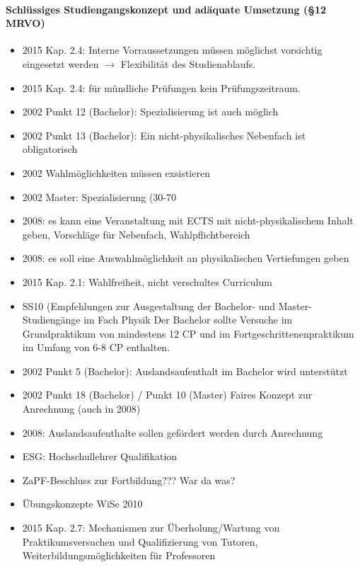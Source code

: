     \paragraph*{Schlüssiges Studiengangskonzept und adäquate Umsetzung (§12 MRVO)}
      \begin{itemize}
        \item 2015 Kap. 2.4: Interne Vorraussetzungen müssen möglichst vorsichtig eingesetzt werden $\rightarrow$ Flexibilität des Studienablaufs.
        \item 2015 Kap. 2.4: für mündliche Prüfungen kein Prüfungszeitraum.
        \item 2002 Punkt 12 (Bachelor): Spezialisierung ist auch möglich
        \item 2002 Punkt 13 (Bachelor): Ein nicht-physikalisches Nebenfach ist obligatorisch
        \item 2002 Wahlmöglichkeiten müssen exsistieren
        \item 2002 Master: Spezialisierung (30-70 %
        \item 2008: es kann eine Veranstaltung mit ECTS mit nicht-physikalischem Inhalt geben, Vorschläge für Nebenfach, Wahlpflichtbereich
        \item 2008: es soll eine Auswahlmöglichkeit an physikalischen Vertiefungen geben
        \item 2015 Kap. 2.1: Wahlfreiheit, nicht verschultes Curriculum
        \item SS10 (Empfehlungen zur Ausgestaltung der Bachelor- und Master-Studiengänge im Fach Physik Der Bachelor sollte Versuche im Grundpraktikum von mindestens 12 CP und im Fortgeschrittenenpraktikum im Umfang von 6-8 CP enthalten.
        \item 2002 Punkt 5 (Bachelor): Auslandsaufenthalt im Bachelor wird unterstützt
        \item 2002 Punkt 18 (Bachelor) / Punkt 10 (Master) Faires Konzept zur Anrechnung (auch in 2008)
        \item 2008: Auslandsaufenthalte sollen gefördert werden durch Anrechnung
        \item ESG: Hochschullehrer Qualifikation
        \item ZaPF-Beschluss zur Fortbildung??? War da was?
        \item Übungskonzepte WiSe 2010
        \item 2015 Kap. 2.7: Mechanismen zur Überholung/Wartung von Praktikumsversuchen und Qualifizierung von Tutoren, Weiterbildungsmöglichkeiten für Professoren

\end{itemize}
